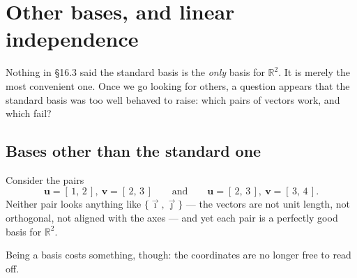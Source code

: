 \documentclass[11pt]{article}
\theoremstyle{definition}
\theoremstyle{remark}
\newcommand{\R}{\mathbb{R}}
\newcommand{\vc}[1]{\mathbf{#1}}
\newcommand{\ivec}{\vec{\imath}}
\newcommand{\jvec}{\vec{\jmath}}
\newcommand{\lattice}[4]{%
  \draw[step=1cm,gray!25,very thin] (#1,#3) grid (#2,#4);
  \draw[axisline] (#1,0) -- (#2+0.45,0) node[right,font=\scriptsize,black]{$x$};
  \draw[axisline] (0,#3) -- (0,#4+0.45) node[above,font=\scriptsize,black]{$y$};
}
\begin{document}
\section{Other bases, and linear independence}
Nothing in \S16.3 said the standard basis is the \emph{only} basis for $\R^{2}$.
It is merely the most convenient one. Once we go looking for others, a question
appears that the standard basis was too well behaved to raise: which pairs of
vectors work, and which fail?

\subsection{Bases other than the standard one}
Consider the pairs
\[
  \vc{u}=[\,1,\,2\,],\ \vc{v}=[\,2,\,3\,]
  \qquad\text{and}\qquad
  \vc{u}=[\,2,\,3\,],\ \vc{v}=[\,3,\,4\,] .
\]
Neither pair looks anything like $\{\ivec,\jvec\}$ --- the vectors are not unit
length, not orthogonal, not aligned with the axes --- and yet each pair is a
perfectly good basis for $\R^{2}$.

\begin{center}
\hspace{1.1cm}
\end{center}

\noindent Being a basis costs something, though: the coordinates are no longer
free to read off.
\end{document}
